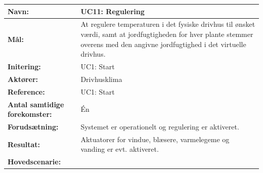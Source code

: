 \clearpage


\begin{table}[h]
\begin{tabularx}{\textwidth}{| >{\raggedright\arraybackslash}p{3.3 cm} | >{\raggedright\arraybackslash}X |} \hline

\textbf{Navn:} 						& UC11: Regulering\\ \hline
\textbf{Mål:}						& At regulere temperaturen i det fysiske drivhus til ønsket værdi, samt at jordfugtigheden for hver plante stemmer overens med den angivne jordfugtighed i det virtuelle drivhus. \\ \hline
\textbf{Initering:}					& UC1: Start \\ \hline
\textbf{Aktører:} 					& Drivhusklima \\ \hline
\textbf{Reference:} 					& UC1: Start \\ \hline
\textbf{Antal samtidige forekomster:} & Én \\ \hline
\textbf{Forudsætning:} 				& Systemet er operationelt og regulering er aktiveret. \\ \hline
\textbf{Resultat:}					& Aktuatorer for vindue, blæsere, varmelegeme og vanding er evt. aktiveret. \\ \hline
\textbf{Hovedscenarie:}				& 


\end{tabularx}
\end{table}
